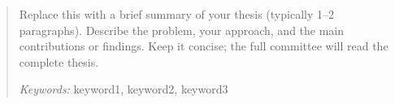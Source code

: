 \thispagestyle{empty}
\begin{abstract}
    Replace this with a brief summary of your thesis (typically 1--2 paragraphs). Describe the problem, your approach, and the main contributions or findings. Keep it concise; the full committee will read the complete thesis.

\vspace{0.3cm}
\noindent\textit{Keywords:} keyword1, keyword2, keyword3
\end{abstract}
